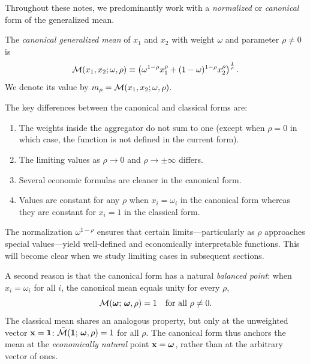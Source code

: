 Throughout these notes, we predominantly work with a \emph{normalized} or \emph{canonical} form of the generalized mean.

\begin{definition}
\label{def:canonical-mean}
The \emph{canonical generalized mean} of $x_1$ and $x_2$ with weight $\omega$ and parameter $\rho \neq 0$ is
\begin{equation}
\label{eq:canonical-mean}
\mathcal{M}(x_1, x_2; \omega, \rho) \equiv \left( \omega^{1-\rho} x_1^\rho + (1-\omega)^{1-\rho} x_2^\rho \right)^{\frac{1}{\rho}}.
\end{equation}
We denote its value by $m_\rho = \mathcal{M}(x_1, x_2; \omega, \rho)$.
\end{definition}
The key differences between the canonical and classical forms are:
\begin{enumerate}[leftmargin=0em]
    \item The weights inside the aggregator do not sum to one (except when $\rho = 0$ in which case, the function is not defined in the current form).
    \item The limiting values as $\rho \to 0$ and $\rho \to \pm\infty$ differs.
    \item Several economic formulas are cleaner in the canonical form.
    \item Values are constant for any $\rho$ when $x_i=\omega_i$ in the canonical form whereas they are constant for $x_i=1$ in the classical form.
\end{enumerate}

\begin{calloutimportant}
The normalization $\omega^{1-\rho}$ ensures that certain limits---particularly as 
$\rho$ approaches special values---yield well-defined and economically interpretable 
functions. This will become clear when we study limiting cases in subsequent sections.

A second reason is that the canonical form has a natural \emph{balanced point}: when 
$x_i = \omega_i$ for all $i$, the canonical mean equals unity for every $\rho$,
\begin{equation*}
    \mathcal{M}(\boldsymbol{\omega};\, \boldsymbol{\omega}, \rho) = 1 \quad \text{for all } \rho \neq 0.
\end{equation*}
The classical mean shares an analogous property, but only at the unweighted vector 
$\mathbf{x} = \mathbf{1}$: $\bar{\mathcal{M}}(\mathbf{1};\, \boldsymbol{\omega}, \rho) = 1$ for all $\rho$. The canonical 
form thus anchors the mean at the \emph{economically natural} point $\mathbf{x} = \boldsymbol{\omega}$, rather 
than at the arbitrary vector of ones. 
\end{calloutimportant}

